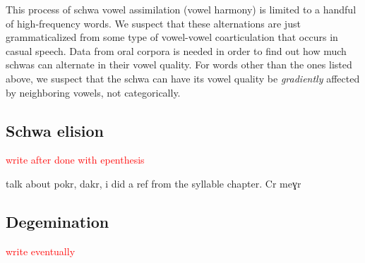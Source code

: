   	This process of schwa vowel assimilation (vowel harmony) is limited to a handful of high-frequency words. We suspect that these alternations are just grammaticalized from some type of vowel-vowel coarticulation that occurs in casual speech. Data from oral corpora is needed in order to find out how much schwas can alternate in their vowel quality. For words other than the ones listed above, we suspect that the schwa can have its vowel quality be \textit{gradiently} affected by neighboring vowels, not categorically. 
  	
  	
  	
  	\subsection{Schwa elision}\label{section:segmentalPhono:sandhi:schwaElision}
  	\textcolor{red}{write after done with epenthesis}
  	
  	talk about pokr, dakr, i did a ref from the syllable chapter. Cr meɣr
  	\subsection{Degemination}\label{section:segmentalPhono:sandhi:degemination}
  	\textcolor{red}{write eventually}
